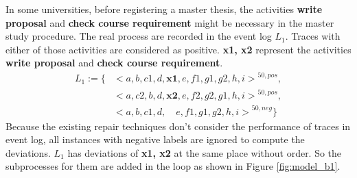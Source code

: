 In some universities, before registering a master thesis, the activities \textbf{write proposal} and \textbf{check course requirement} might be necessary in the master study procedure. The real process are recorded in the event log $L_1$. Traces with either of those activities are considered as positive.  \textbf{x1, x2} represent the activities \textbf{write proposal} and \textbf{check course requirement}.
\begin{align*}
		L_1:= \{ &  {<a,b,c1,d,\textbf{x1},e,f1,g1,g2,h,i>}^{50, pos}, \\   
		  &{<a,c2,b,d,\textbf{x2}, e, f2,g2,g1,h,i>}^{50,pos}, \\
		& {<a,b,c1,d,\quad e, f1,g1,g2,h,i>}^{50, neg} \}
		\end{align*}
Because the existing repair techniques  \cite{fahland2015model} don't consider the performance of traces in event log, all instances with negative labels are ignored to compute the deviations. $L_1$ has deviations of \textbf{x1, x2} at the same place without order. So the subprocesses for them are added in the loop as shown in Figure \ref{fig:model_b1}.  
